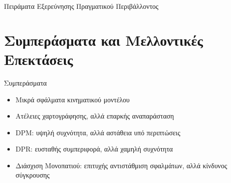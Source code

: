 \documentclass[10pt, compress]{beamer}
\begin{document}
\begin{frame}{Πειράματα Εξερεύνησης Πραγματικού Περιβάλλοντος}
	\begin{figure}
      \captionsetup[subfigure]{labelformat=empty,position=top}
		\hspace{0.05\linewidth}
	\end{figure}	

	\begin{table}[!ht]
		\centering
	\end{table}
\end{frame}

\section{Συμπεράσματα και Μελλοντικές Επεκτάσεις}

\begin{frame}{Συμπεράσματα}
	\begin{itemize}
		\item Μικρά σφάλματα κινηματικού μοντέλου
		\item Ατέλειες χαρτογράφησης, αλλά επαρκής αναπαράσταση
		\item DPM: υψηλή συχνότητα, αλλά αστάθεια υπό περιπτώσεις
		\item DPR: ευσταθής συμπεριφορά, αλλά χαμηλή συχνότητα
		\item Διάσχιση Μονοπατιού: επιτυχής αντιστάθμιση σφαλμάτων, αλλά κίνδυνος σύγκρουσης
	\end{itemize}
\end{frame}
\end{document}
